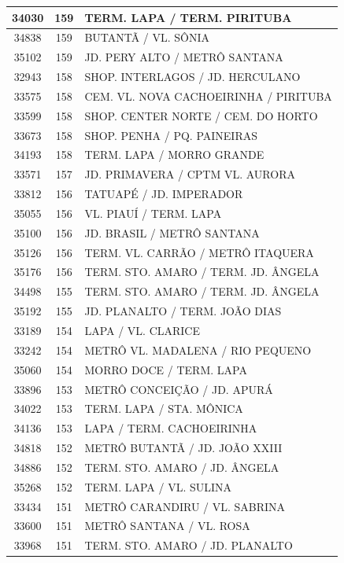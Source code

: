 \documentclass[
	12pt,				%
	oneside,			%
	a4paper,			%
	english,			%
	brazil				%
	]{abntex2ppgsi}
\begin{document}
{{{\begin{apendicesenv}
\begin{longtable}{c|c|p{7cm}}
 \hline 
34030 &	159 &	TERM. LAPA / TERM. PIRITUBA \\ 
 \hline 
34838 &	159 &	BUTANTÃ / VL. SÔNIA \\ 
 \hline 
35102 &	159 &	JD. PERY ALTO / METRÔ SANTANA \\ 
 \hline 
32943 &	158 &	SHOP. INTERLAGOS / JD. HERCULANO \\ 
 \hline 
33575 &	158 &	CEM. VL. NOVA CACHOEIRINHA / PIRITUBA \\ 
 \hline 
33599 &	158 &	SHOP. CENTER NORTE / CEM. DO HORTO \\ 
 \hline 
33673 &	158 &	SHOP. PENHA / PQ. PAINEIRAS \\ 
 \hline 
34193 &	158 &	TERM. LAPA / MORRO GRANDE \\ 
 \hline 
33571 &	157 &	JD. PRIMAVERA / CPTM VL. AURORA \\ 
 \hline 
33812 &	156 &	TATUAPÉ / JD. IMPERADOR \\ 
 \hline 
35055 &	156 &	VL. PIAUÍ / TERM. LAPA \\ 
 \hline 
35100 &	156 &	JD. BRASIL / METRÔ SANTANA \\ 
 \hline 
35126 &	156 &	TERM. VL. CARRÃO / METRÔ ITAQUERA \\ 
 \hline 
35176 &	156 &	TERM. STO. AMARO / TERM. JD. ÂNGELA \\ 
 \hline 
34498 &	155 &	TERM. STO. AMARO / TERM. JD. ÂNGELA \\ 
 \hline 
35192 &	155 &	JD. PLANALTO / TERM. JOÃO DIAS \\ 
 \hline 
33189 &	154 &	LAPA / VL. CLARICE \\ 
 \hline 
33242 &	154 &	METRÔ VL. MADALENA / RIO PEQUENO \\ 
 \hline 
35060 &	154 &	MORRO DOCE / TERM. LAPA \\ 
 \hline 
33896 &	153 &	METRÔ CONCEIÇÃO / JD. APURÁ \\ 
 \hline 
34022 &	153 &	TERM. LAPA / STA. MÔNICA \\ 
 \hline 
34136 &	153 &	LAPA / TERM. CACHOEIRINHA \\ 
 \hline 
34818 &	152 &	METRÔ BUTANTÃ / JD. JOÃO XXIII \\ 
 \hline 
34886 &	152 &	TERM. STO. AMARO / JD. ÂNGELA \\ 
 \hline 
35268 &	152 &	TERM. LAPA / VL. SULINA \\ 
 \hline 
33434 &	151 &	METRÔ CARANDIRU / VL. SABRINA \\ 
 \hline 
33600 &	151 &	METRÔ SANTANA / VL. ROSA \\ 
 \hline 
33968 &	151 &	TERM. STO. AMARO / JD. PLANALTO \\ 

\end{longtable}
\end{apendicesenv}}}}
\end{document}
